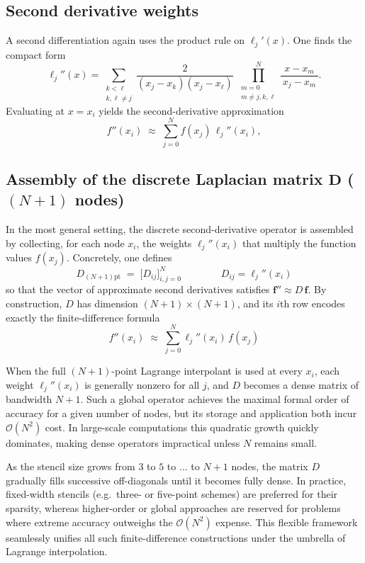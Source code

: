 \subsection{Second derivative weights}

A second differentiation again uses the product rule on \(\ell_j'(x)\).  One finds the compact form
\[
\ell_j''(x)
=
\sum_{\substack{k<\ell\\k,\ell\neq j}}
\frac{2}{(x_j - x_k)(x_j - x_\ell)}
\;\prod_{\substack{m=0\\m\neq j,k,\ell}}^{N}
\frac{x - x_m}{\,x_j - x_m\,}.
\]
Evaluating at \(x = x_i\) yields the second-derivative approximation
\[
f''(x_i)
\;\approx\;
\sum_{j=0}^N
f(x_j)\,\ell_j''(x_i),
\]

\clearpage

\subsection{Assembly of the discrete Laplacian matrix \(\boldsymbol{D}\) (\((N+1)\) nodes)}

In the most general setting, the discrete second-derivative operator is assembled by collecting, for each node \(x_i\), the weights \(\ell_j''(x_i)\) that multiply the function values \(f(x_j)\).  Concretely, one defines
\[
D_{(N+1)\text{pt}}
\;=\;
\bigl[D_{ij}\bigr]_{i,j=0}^N
\qquad \qquad
D_{ij} = \ell_j''(x_i)
\]
so that the vector of approximate second derivatives satisfies
\(\mathbf{f}''\approx D\,\mathbf{f}\).  By construction, \(D\) has dimension \((N+1)\times(N+1)\), and its \(i\)th row encodes exactly the finite-difference formula
\[
f''(x_i)\;\approx\;\sum_{j=0}^N \ell_j''(x_i)\,f(x_j)
\]

When the full \((N+1)\)-point Lagrange interpolant is used at every \(x_i\), each weight \(\ell_j''(x_i)\) is generally nonzero for all \(j\), and \(D\) becomes a dense matrix of bandwidth \(N+1\).  Such a global operator achieves the maximal formal order of accuracy for a given number of nodes, but its storage and application both incur \(\mathcal O(N^2)\) cost.  In large-scale computations this quadratic growth quickly dominates, making dense operators impractical unless \(N\) remains small.

As the stencil size grows from \(3\) to \(5\) to \(\dots\) to \(N+1\) nodes, the matrix \(D\) gradually fills successive off-diagonals until it becomes fully dense.  In practice, fixed-width stencils (e.g.\ three- or five-point schemes) are preferred for their sparsity, whereas higher-order or global approaches are reserved for problems where extreme accuracy outweighs the \(\mathcal O(N^2)\) expense. This flexible framework seamlessly unifies all such finite-difference constructions under the umbrella of Lagrange interpolation.

